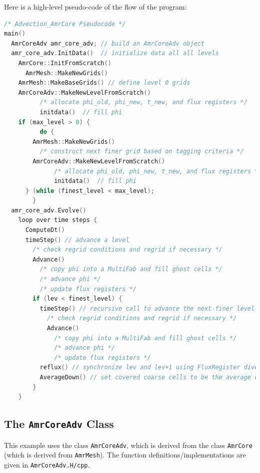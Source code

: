 Here is a high-level pseudo-code of the flow of the program:
\begin{lstlisting}[language=cpp]
/* Advection_AmrCore Pseudocode */
main()
  AmrCoreAdv amr_core_adv; // build an AmrCoreAdv object
  amr_core_adv.InitData()  // initialize data all all levels
    AmrCore::InitFromScratch()
      AmrMesh::MakeNewGrids()
	AmrMesh::MakeBaseGrids() // define level 0 grids
	AmrCoreAdv::MakeNewLevelFromScratch()
          /* allocate phi_old, phi_new, t_new, and flux registers */
          initdata()  // fill phi
	if (max_level > 0) {
          do {
  	    AmrMesh::MakeNewGrids()
	      /* construct next finer grid based on tagging criteria */
 	    AmrCoreAdv::MakeNewLevelFromScratch()
              /* allocate phi_old, phi_new, t_new, and flux registers */
              initdata()  // fill phi
	  } (while (finest_level < max_level);
        }
  amr_core_adv.Evolve()
    loop over time steps {
      ComputeDt()
      timeStep() // advance a level
        /* check regrid conditions and regrid if necessary */
        Advance()
          /* copy phi into a MultiFab and fill ghost cells */
          /* advance phi */
          /* update flux registers */
        if (lev < finest_level) {
          timeStep() // recursive call to advance the next-finer level "r" times
            /* check regrid conditions and regrid if necessary */
            Advance()
              /* copy phi into a MultiFab and fill ghost cells */
              /* advance phi */
              /* update flux registers */
          reflux() // synchronize lev and lev+1 using FluxRegister divergence
          AverageDown() // set covered coarse cells to be the average of fine
        }
    }
\end{lstlisting}

\subsection{The {\tt AmrCoreAdv} Class}
This example uses the class {\tt AmrCoreAdv}, which is derived from the class {\tt AmrCore} 
(which is derived from {\tt AmrMesh}).  The function definitions/implementations
are given in {\tt AmrCoreAdv.H/cpp}.

